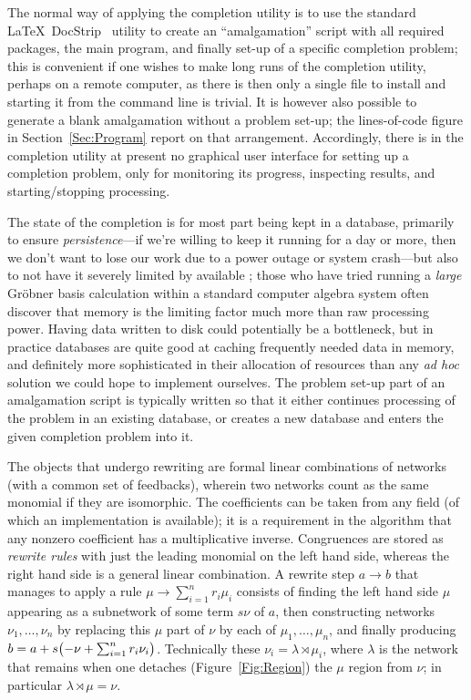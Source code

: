 \documentclass{article}
\theoremstyle{definition}
\begin{document}
The normal way of applying the completion utility is to use the 
standard \LaTeX\ \textsf{DocStrip}~\cite{docstrip} utility to create 
an ``amalgamation'' script with all required packages, the main 
program, and finally set-up of a specific completion problem; this is 
convenient if one wishes to make long runs of the completion 
utility, perhaps on a remote computer, as there is then only a single 
file to install and starting it from the command line is trivial. It 
is however also possible to generate a blank amalgamation without a 
problem set-up; the lines-of-code figure in Section~\ref{Sec:Program} 
report on that arrangement. Accordingly, there is in the completion 
utility at present no graphical user interface for setting up a 
completion problem, only for monitoring its progress, inspecting 
results, and starting\slash stopping processing.

The state of the completion is for most part being kept in a 
database, primarily to ensure \emph{persistence}---if we're willing 
to keep it running for a day or more, then we don't want to lose our 
work due to a power outage or system crash---but also to not have it 
severely limited by available ; those who have tried running a 
\emph{large} Gr\"obner basis calculation within a standard computer 
algebra system often discover that memory is the limiting factor much 
more than raw processing power. Having data written to disk could 
potentially be a bottleneck, but in practice databases are quite good 
at caching frequently needed data in memory, and definitely more 
sophisticated in their allocation of resources than any \emph{ad hoc} 
solution we could hope to implement ourselves. The problem set-up part 
of an amalgamation script is typically written so that it either 
continues processing of the problem in an existing database, or 
creates a new database and enters the given completion problem into 
it.

The objects that undergo rewriting are formal linear combinations of 
networks (with a common set of feedbacks), wherein two networks count 
as the same monomial if they are isomorphic. The coefficients can be 
taken from any field (of which an implementation is available); it is 
a requirement in the algorithm that any nonzero coefficient has a 
multiplicative inverse. Congruences are stored as \emph{rewrite rules} 
with just the leading monomial on the left hand side, whereas the 
right hand side is a general linear combination. A rewrite step 
\(a \to b\) that manages to apply a rule \(\mu \to \sum_{i=1}^n r_i 
\mu_i\) consists of finding the left hand side $\mu$ appearing as a 
subnetwork of some term $s\nu$ of $a$, then constructing networks 
$\nu_1,\dotsc,\nu_n$ by replacing this $\mu$ part of $\nu$ by each of 
$\mu_1,\dotsc,\mu_n$, and finally producing \(b = a + s\bigl( -\nu 
+\nobreak \sum_{i=1}^n r_i \nu_i \bigr) \). Technically these 
\(\nu_i = \lambda \rtimes \mu_i\), where $\lambda$ is the network 
that remains when one detaches (Figure~\ref{Fig:Region}) the $\mu$ 
region from $\nu$; in particular \(\lambda \rtimes \mu = \nu\).
\end{document}
